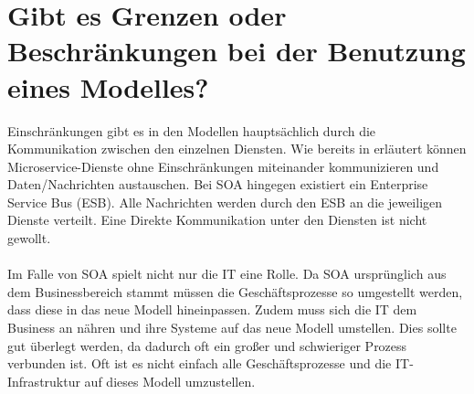 \section{Gibt es Grenzen oder Beschränkungen bei der Benutzung eines Modelles?}
\label{sec:Beschraenkungen}
Einschränkungen gibt es in den Modellen hauptsächlich durch die Kommunikation zwischen den einzelnen Diensten. Wie bereits in  erläutert können Microservice-Dienste ohne Einschränkungen miteinander kommunizieren und Daten/Nachrichten austauschen. Bei SOA hingegen existiert ein Enterprise Service Bus (ESB). Alle Nachrichten werden durch den ESB an die jeweiligen Dienste verteilt. Eine Direkte Kommunikation unter den Diensten ist nicht gewollt.
\\\\
Im Falle von SOA spielt nicht nur die IT eine Rolle. Da SOA ursprünglich aus dem Businessbereich stammt müssen die Geschäftsprozesse so umgestellt werden, dass diese in das neue Modell hineinpassen. Zudem muss sich die IT dem Business an nähren und ihre Systeme auf das neue Modell umstellen. Dies sollte gut überlegt werden, da dadurch oft ein großer und schwieriger Prozess verbunden ist. Oft ist es nicht einfach alle Geschäftsprozesse und die IT-Infrastruktur auf dieses Modell umzustellen.

